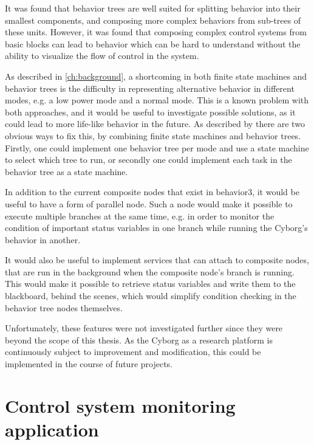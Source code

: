 \documentclass[\rootfolder/main.tex]{subfiles}
\begin{document}
It was found that behavior trees are well suited for splitting behavior into their smallest components, and composing more complex behaviors from sub-trees of these units.
However, it was found that composing complex control systems from basic blocks can lead to behavior which can be hard to understand without the ability to visualize the flow of control in the system.

As described in \cref{ch:background}, a shortcoming in both finite state machines and behavior trees is the difficulty in representing alternative behavior in different modes, e.g. a low power mode and a normal mode.
This is a known problem with both approaches, and it would be useful to investigate possible solutions, as it could lead to more life-like behavior in the future.
As described by \cite{Millington2009} there are two obvious ways to fix this, by combining finite state machines and behavior trees.
Firstly, one could implement one behavior tree per mode and use a state machine to select which tree to run, or secondly one could implement each task in the behavior tree as a state machine.

In addition to the current composite nodes that exist in behavior3, it would be useful to have a form of parallel node.
Such a node would make it possible to execute multiple branches at the same time, e.g. in order to monitor the condition of important status variables in one branch while running the Cyborg's behavior in another.

It would also be useful to implement services that can attach to composite nodes, that are run in the background when the composite node's branch is running.
This would make it possible to retrieve status variables and write them to the blackboard, behind the scenes, which would simplify condition checking in the behavior tree nodes themselves.

Unfortunately, these features were not investigated further since they were beyond the scope of this thesis.
As the Cyborg as a research platform is continuously subject to improvement and modification, this could be implemented in the course of future projects.


\section{Control system monitoring application}
\end{document}
